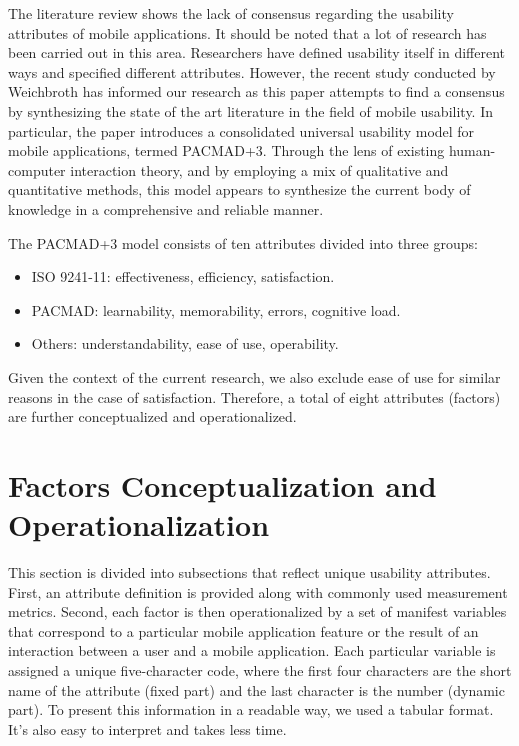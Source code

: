 \documentclass[preprint,12pt]{elsarticle}
\begin{document}
The literature review shows the lack of consensus regarding the usability attributes of mobile applications. It should be noted that a lot of research has been carried out in this area. Researchers have defined usability itself in different ways and specified different attributes. However, the recent study conducted by Weichbroth \cite{weichbroth2024usability} has informed our research as this paper attempts to find a consensus by synthesizing the state of the art literature in the field of mobile usability. 
In particular, the paper introduces a consolidated universal usability model for mobile applications, termed PACMAD+3. Through the lens of existing human-computer interaction theory, and by employing a mix of qualitative and quantitative methods, this model appears to synthesize the current body of knowledge in a comprehensive and reliable manner. 

The PACMAD+3 model consists of ten attributes divided into three groups:
\begin{itemize}
    \item ISO 9241-11: effectiveness, efficiency, satisfaction.
    \item PACMAD: learnability, memorability, errors, cognitive load.
    \item Others: understandability, ease of use, operability.
\end{itemize}

Given the context of the current research, we also exclude ease of use for similar reasons in the case of satisfaction. Therefore, a total of eight attributes (factors) are further conceptualized and operationalized. 

\section{Factors Conceptualization and Operationalization}
This section is divided into subsections that reflect unique usability attributes. First, an attribute definition is provided along with commonly used measurement metrics. Second, each factor is then operationalized by a set of manifest variables that correspond to a particular mobile application feature or the result of an interaction between a user and a mobile application. Each particular variable is assigned a unique five-character code, where the first four characters are the short name of the attribute (fixed part) and the last character is the number (dynamic part). To present this information in a readable way, we used a tabular format. It's also easy to interpret and takes less time.
\end{document}
